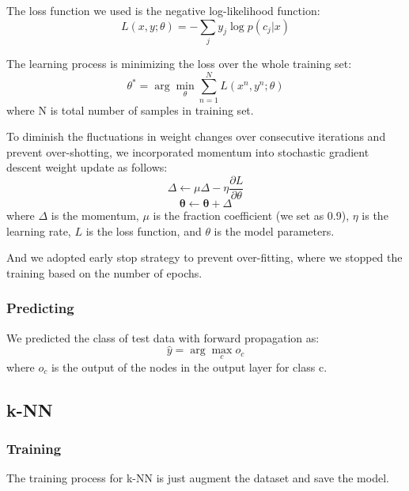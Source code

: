 \documentclass{article} %
\begin{document}
The loss function we used is the negative log-likelihood function:
\begin{equation}
L(x, y; \theta) = -\sum_jy_j\log p(c_j|x)
\end{equation}

The learning process is minimizing the loss over the whole training set:
\begin{equation}
\theta^* = \arg\min_\theta\sum_{n=1}^NL(x^n, y^n; \theta)
\end{equation}
where N is total number of samples in training set. 

To diminish the fluctuations in weight changes over consecutive iterations and prevent over-shotting, we incorporated momentum into stochastic gradient descent weight update as follows:
\begin{equation}
\Delta \leftarrow \mu\Delta-\eta\frac{\partial L}{\partial \theta}
\end{equation}
\begin{equation}
\mathbf{\theta} \leftarrow \mathbf{\theta}+\Delta
\end{equation}
where $\Delta$ is the momentum, $\mu$ is the fraction coefficient (we set as 0.9), $\eta$ is the learning rate, $L$ is the loss function, and $\theta$ is the model parameters.

And we adopted early stop strategy to prevent over-fitting, where we stopped the training based on the number of epochs.

\subsubsection{Predicting}
We predicted the class of test data with forward propagation as:
\begin{equation}
\hat{y}=\arg\max_{c}o_{c}
\end{equation}
where $o_{c}$ is the output of the nodes in the output layer for class c.

\subsection{k-NN}
\subsubsection{Training}
The training process for k-NN is just augment the dataset and save the model.
\end{document}
